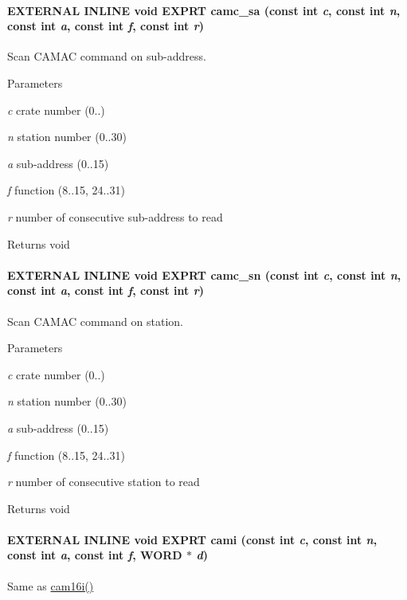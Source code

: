\paragraph[{camc\_\-sa}]{\setlength{\rightskip}{0pt plus 5cm}EXTERNAL INLINE void EXPRT camc\_\-sa (const int {\em c}, \/  const int {\em n}, \/  const int {\em a}, \/  const int {\em f}, \/  const int {\em r})}\hfill\label{group__mcstdfunctionh_ga27478b06e734c38fc4fe80dc09800885}
Scan CAMAC command on sub-\/address. 
\begin{DoxyParams}{Parameters}
\item[{\em c}]crate number (0..) \item[{\em n}]station number (0..30) \item[{\em a}]sub-\/address (0..15) \item[{\em f}]function (8..15, 24..31) \item[{\em r}]number of consecutive sub-\/address to read \end{DoxyParams}
\begin{DoxyReturn}{Returns}
void 
\end{DoxyReturn}
\paragraph[{camc\_\-sn}]{\setlength{\rightskip}{0pt plus 5cm}EXTERNAL INLINE void EXPRT camc\_\-sn (const int {\em c}, \/  const int {\em n}, \/  const int {\em a}, \/  const int {\em f}, \/  const int {\em r})}\hfill\label{group__mcstdfunctionh_gac0cc56a7f806a800509f819a91a9e1c6}
Scan CAMAC command on station. 
\begin{DoxyParams}{Parameters}
\item[{\em c}]crate number (0..) \item[{\em n}]station number (0..30) \item[{\em a}]sub-\/address (0..15) \item[{\em f}]function (8..15, 24..31) \item[{\em r}]number of consecutive station to read \end{DoxyParams}
\begin{DoxyReturn}{Returns}
void 
\end{DoxyReturn}
\paragraph[{cami}]{\setlength{\rightskip}{0pt plus 5cm}EXTERNAL INLINE void EXPRT cami (const int {\em c}, \/  const int {\em n}, \/  const int {\em a}, \/  const int {\em f}, \/  {\bf WORD} $\ast$ {\em d})}\hfill\label{group__mcstdfunctionh_ga859bdf77e425ce09a21c873a86c8af70}
Same as \hyperlink{group__mcstdfunctionh_gad17f339ee8254f1aad6b406e50ebd4a8}{cam16i()} 
